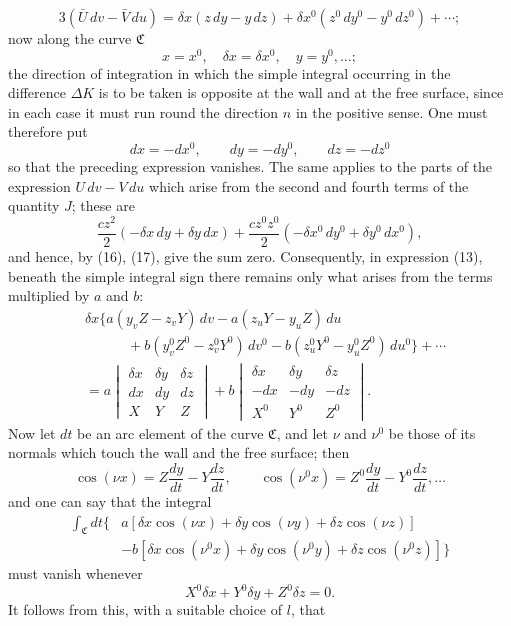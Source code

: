 \documentclass[11pt,a4paper,leqno]{article}
\begin{document}
\[
3(\bar U\,dv-\bar V\,du)
=\delta x(z\,dy-y\,dz)
+\delta x^0(z^0\,dy^0-y^0\,dz^0)+\cdots;
\]
now along the curve $\mathfrak{C}$
\begin{equation}\tag{16}
x=x^0,\quad \delta x=\delta x^0,\quad y=y^0,\ldots;
\end{equation}
the direction of integration in which the simple integral occurring in the
difference $\Delta K$ is to be taken is opposite at the wall and at the free
surface, since in each case it must run round the direction $n$ in the positive
sense. One must therefore put
\begin{equation}\tag{17}
dx=-dx^0,\qquad dy=-dy^0,\qquad dz=-dz^0
\end{equation}
so that the preceding expression vanishes. The same applies to the parts of
the expression $U\,dv-V\,du$ which arise from the second and fourth terms of
the quantity $J$; these are
\[
\frac{cz^2}{2}(-\delta x\,dy+\delta y\,dx)
+\frac{cz^0z^0}{2}(-\delta x^0\,dy^0+\delta y^0\,dx^0),
\]
and hence, by (16), (17), give the sum zero. Consequently, in expression (13),
beneath the simple integral sign there remains only what arises from the terms
multiplied by $a$ and $b$:
\[
\begin{aligned}
&\delta x\{a(y_vZ-z_vY)\,dv-a(z_uY-y_uZ)\,du\\
&\qquad\quad+b(y_v^0Z^0-z_v^0Y^0)\,dv^0
-b(z_u^0Y^0-y_u^0Z^0)\,du^0\}+\cdots\\
&=a\begin{vmatrix}
\delta x&\delta y&\delta z\\
dx&dy&dz\\
X&Y&Z
\end{vmatrix}
+b\begin{vmatrix}
\delta x&\delta y&\delta z\\
-dx&-dy&-dz\\
X^0&Y^0&Z^0
\end{vmatrix}.
\end{aligned}
\]
Now let $dt$ be an arc element of the curve $\mathfrak{C}$, and let $\nu$ and
$\nu^0$ be those of its normals which touch the wall and the free surface;
then
\[
\cos(\nu x)=Z\frac{dy}{dt}-Y\frac{dz}{dt},\qquad
\cos(\nu^0x)=Z^0\frac{dy}{dt}-Y^0\frac{dz}{dt},\ldots
\]
and one can say that the integral
\[
\begin{aligned}
\int_{\mathfrak{C}}dt\{&a[\delta x\cos(\nu x)+\delta y\cos(\nu y)
+\delta z\cos(\nu z)]\\
&-b[\delta x\cos(\nu^0x)+\delta y\cos(\nu^0y)
+\delta z\cos(\nu^0z)]\}
\end{aligned}
\]
must vanish whenever
\[
X^0\delta x+Y^0\delta y+Z^0\delta z=0.
\]
It follows from this, with a suitable choice of $l$, that
\end{document}
